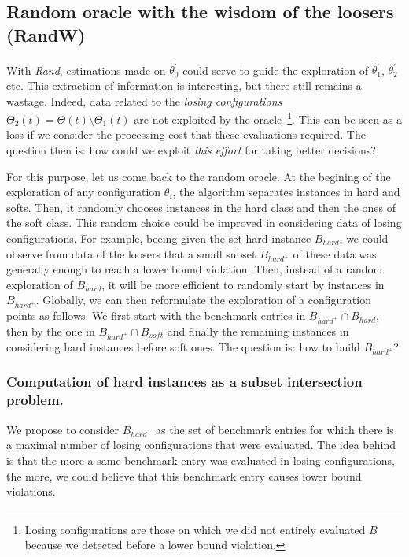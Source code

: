 \documentclass[10pt, conference, compsocconf]{IEEEtran}
\begin{document}
\subsection{Random oracle with the wisdom of the loosers (RandW)}

With {\it Rand}, estimations made on $\bar{\theta^{'}_0}$ could serve
to guide the exploration of $\bar{\theta^{'}_{1}}$,
$\bar{\theta^{'}_{2}}$ etc. This extraction of information is
interesting, but there still remains a wastage. Indeed, data related
to the {\it losing configurations}
$\Theta_2(t) = \Theta(t) \setminus \Theta_1(t)$ are not exploited by
the oracle~\footnote{Losing configurations are those on which we did
  not entirely evaluated $B$ because we detected before a lower bound
  violation.}.  This can be seen as a loss if we consider the
processing cost that these evaluations required. The question then is:
how could we exploit {\it this effort} for taking better decisions?

For this purpose, let us come back to the random oracle. At the
begining of the exploration of any configuration $\theta_i$, the
algorithm separates instances in hard and softs. Then, it randomly
chooses instances in the hard class and then the ones of the soft
class. This random choice could be improved in considering data of
losing configurations. For example, beeing given the set hard instance
$B_{hard}$, we could observe from data of the loosers that a small
subset $B_{hard^+}$ of these data was generally enough to reach a
lower bound violation. Then, instead of a random exploration of
$B_{hard}$, it will be more efficient to randomly start by instances
in $B_{hard^+}$.  Globally, we can then reformulate the exploration of
a configuration points as follows. We first start with the benchmark
entries in $B_{hard^+} \cap B_{hard}$, then by the one in
$B_{hard^+} \cap B_{soft}$ and finally the remaining instances in
considering hard instances before soft ones. The question is: how to
build $B_{hard^+}$?


\subsubsection{Computation of hard instances as a subset intersection problem.} 

We propose to consider $B_{hard^+}$ as the set of benchmark entries
for which there is a maximal number of losing configurations that were
evaluated. The idea behind is that the more a same benchmark entry was
evaluated in losing configurations, the more, we could believe that
this benchmark entry causes lower bound violations.
\end{document}
